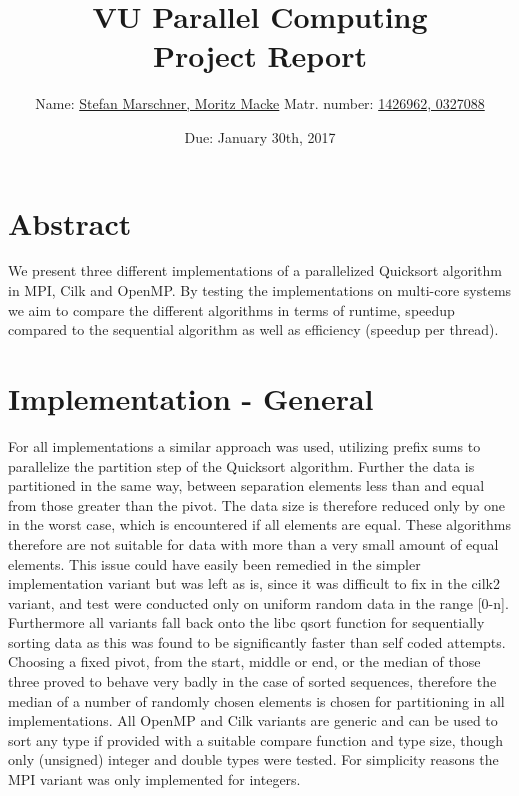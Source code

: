 \documentclass[12pt,a4paper]{article}
\title{VU Parallel Computing\\ 
\Large Project Report}
\author{Name: \underline{Stefan Marschner, Moritz Macke}\qquad
  Matr. number: \underline{1426962, 0327088}}
\date{Due: January 30th, 2017}
\begin{document}
\maketitle
\section{Abstract}

We present three different implementations of a parallelized Quicksort algorithm in MPI, Cilk and OpenMP. By testing the implementations on multi-core systems we aim to compare the different algorithms in terms of runtime, speedup compared to the sequential algorithm as well as efficiency (speedup per thread).

\section{Implementation - General}

For all implementations a similar approach was used, utilizing prefix sums to parallelize the partition step of the Quicksort algorithm. Further the data is partitioned in the same way, between separation elements less than and equal from those greater than the pivot. The data size is therefore reduced only by one in the worst case, which is encountered if all elements are equal. These algorithms therefore are not suitable for data with more than a very small amount of equal elements. This issue could have easily been remedied in the simpler implementation variant but was left as is, since it was difficult to fix in the cilk2 variant, and test were conducted only on uniform random data in the range [0-n]. Furthermore all variants fall back onto the libc qsort function for sequentially sorting data as this was found to be significantly faster than self coded attempts. 
Choosing a fixed pivot, from the start, middle or end, or the median of those three proved to behave very badly in the case of sorted sequences, therefore the median of a number of randomly chosen elements is chosen for partitioning in all implementations. 
All OpenMP and Cilk variants are generic and can be used to sort any type if provided with a suitable compare function and type size, though only (unsigned) integer and double types were tested. For simplicity reasons the MPI variant was only implemented for integers.
\end{document}
